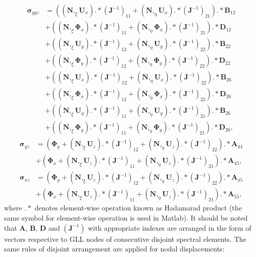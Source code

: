 \documentclass[preprint,12pt]{elsarticle}
\renewcommand{\vec}[1]{\mathbf{#1}}
\renewcommand{\bm}[1]{\mathbf{#1}}
\newcommand{\bs}[1]{\boldsymbol{#1}}
\begin{document}
	\begin{equation}
	\begin{split}
	\bs{\sigma}_{yyz}&=\left((\bm{N},_{\xi}\vec{U}_x).*(\vec{J}^{-1})_{11}+(\bm{N},_{\eta}\vec{U}_x).*(\vec{J}^{-1})_{21}\right).*\vec{B}_{12}\\
	&+\left((\bm{N},_{\xi}\bs{\Phi}_x).*(\vec{J}^{-1})_{11}+(\bm{N},_{\eta}\bs{\Phi}_x).*(\vec{J}^{-1})_{21}\right).*\vec{D}_{12}\\
	&+\left((\bm{N},_{\xi}\vec{U}_y).*(\vec{J}^{-1})_{12}+(\bm{N},_{\eta}\vec{U}_y).*(\vec{J}^{-1})_{22}\right).*\vec{B}_{22}\\
	&+\left((\bm{N},_{\xi}\bs{\Phi}_y).*(\vec{J}^{-1})_{12}+(\bm{N},_{\eta}\bs{\Phi}_y).*(\vec{J}^{-1})_{22}\right).*\vec{D}_{22}\\
	&+\left((\bm{N},_{\xi}\vec{U}_x).*(\vec{J}^{-1})_{12}+(\bm{N},_{\eta}\vec{U}_x).*(\vec{J}^{-1})_{22}\right).*\vec{B}_{26}\\
	&+\left((\bm{N},_{\xi}\bs{\Phi}_x).*(\vec{J}^{-1})_{12}+(\bm{N},_{\eta}\bs{\Phi}_x).*(\vec{J}^{-1})_{22}\right).*\vec{D}_{26}\\
	&+\left((\bm{N},_{\xi}\vec{U}_y).*(\vec{J}^{-1})_{11}+(\bm{N},_{\eta}\vec{U}_y).*(\vec{J}^{-1})_{21}\right).*\vec{B}_{26}\\
	&+\left((\bm{N},_{\xi}\bs{\Phi}_y).*(\vec{J}^{-1})_{11}+(\bm{N},_{\eta}\bs{\Phi}_y).*(\vec{J}^{-1})_{21}\right).*\vec{D}_{26},
	\end{split}
	\end{equation}
	\begin{equation}
	\begin{split}
	\bs{\sigma}_{yz}&=\left(\bs{\Phi}_y+(\bm{N},_{\xi}\vec{U}_z).*(\vec{J}^{-1})_{12}+(\bm{N},_{\eta}\vec{U}_z).*(\vec{J}^{-1})_{22}\right).*\vec{A}_{44}\\
	&+\left(\bs{\Phi}_x+(\bm{N},_{\xi}\vec{U}_z).*(\vec{J}^{-1})_{11}+(\bm{N},_{\eta}\vec{U}_z).*(\vec{J}^{-1})_{21}\right).*\vec{A}_{45},\\
	\bs{\sigma}_{xz}&=\left(\bs{\Phi}_y+(\bm{N},_{\xi}\vec{U}_z).*(\vec{J}^{-1})_{12}+(\bm{N},_{\eta}\vec{U}_z).*(\vec{J}^{-1})_{22}\right).*\vec{A}_{45}\\
	&+\left(\bs{\Phi}_x+(\bm{N},_{\xi}\vec{U}_z).*(\vec{J}^{-1})_{11}+(\bm{N},_{\eta}\vec{U}_z).*(\vec{J}^{-1})_{21}\right).*\vec{A}_{55},
	\end{split}
	\end{equation}
	where $.*$ denotes element-wise operation known as Hadamarad product (the same symbol for element-wise operation is used in Matlab). It should be noted that $\vec{A}$, $\vec{B}$, $\vec{D}$ and $(\vec{J}^{-1})$ with appropriate indexes are arranged in the form of vectors respective to GLL nodes of consecutive disjoint spectral elements. The same rules of disjoint arrangement are applied for nodal displacements:
\end{document}

